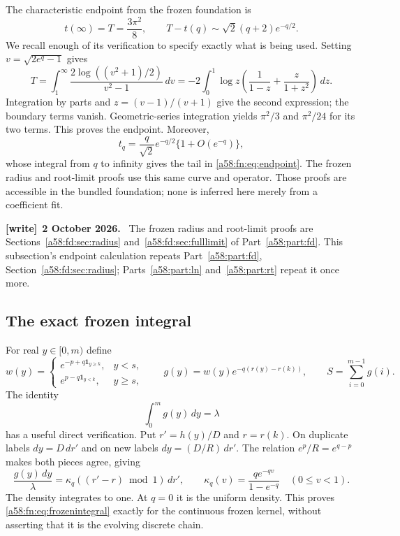 \documentclass[11pt,letterpaper]{article}
\theoremstyle{remark}
\newcommand{\one}{\mathbf 1}
\newenvironment{writenote}[1][]{\par\smallskip\begingroup\small
 \noindent\textbf{[write]}\if\relax\detokenize{#1}\relax\else~\textbf{#1.}\fi\ }%
 {\par\endgroup\smallskip}
\begin{document}
The characteristic endpoint from the frozen foundation is
\begin{equation}\label{a58:fn:eq:endpoint}
 t(\infty)=T=\frac{3\pi^2}{8},\qquad
 T-t(q)\sim\sqrt2(q+2)e^{-q/2}.
\end{equation}
We recall enough of its verification to specify exactly what is being used. Setting $v=\sqrt{2e^q-1}$ gives
\[
 T=\int_1^\infty\frac{2\log((v^2+1)/2)}{v^2-1}\,dv
   =-2\int_0^1\log z\left(\frac1{1-z}+\frac z{1+z^2}\right)\,dz.
\]
Integration by parts and $z=(v-1)/(v+1)$ give the second expression; the boundary terms vanish. Geometric-series integration yields $\pi^2/3$ and $\pi^2/24$ for its two terms. This proves the endpoint. Moreover,
\[
 t_q=\frac q{\sqrt2}e^{-q/2}\{1+O(e^{-q})\},
\]
whose integral from $q$ to infinity gives the tail in \eqref{a58:fn:eq:endpoint}.
The frozen radius and root-limit proofs use this same curve and operator. Those proofs are accessible in the bundled foundation; none is inferred here merely from a coefficient fit.
\begin{writenote}[2 October 2026]
The frozen radius and root-limit proofs are Sections~\ref{a58:fd:sec:radius} and~\ref{a58:fd:sec:fulllimit} of Part~\ref{a58:part:fd}. This subsection's endpoint calculation repeats Part~\ref{a58:part:fd}, Section~\ref{a58:fd:sec:radius}; Parts~\ref{a58:part:ln} and~\ref{a58:part:rt} repeat it once more.
\end{writenote}

\subsection{The exact frozen integral}
For real $y\in[0,m)$ define
\begin{equation}\label{a58:fn:eq:frozeng}
 w(y)=\begin{cases}e^{-p+q\one_{y\ge k}},&y<s,\\
 e^{p-q\one_{y<k}},&y\ge s,
 \end{cases}
 \qquad g(y)=w(y)e^{-q(r(y)-r(k))},\qquad
 S=\sum_{i=0}^{m-1}g(i).
\end{equation}
The identity
\begin{equation}\label{a58:fn:eq:frozenintegral}
 \int_0^m g(y)\,dy=\lambda
\end{equation}
has a useful direct verification. Put $r'=h(y)/D$ and $r=r(k)$. On duplicate labels $dy=D\,dr'$ and on new labels $dy=(D/R)\,dr'$. The relation $e^p/R=e^{q-p}$ makes both pieces agree, giving
\begin{equation}\label{a58:fn:eq:circle}
 \frac{g(y)\,dy}{\lambda}
 =\kappa_q((r'-r)\bmod1)\,dr',\qquad
 \kappa_q(v)=\frac{qe^{-qv}}{1-e^{-q}}\quad(0\le v<1).
\end{equation}
The density integrates to one. At $q=0$ it is the uniform density. This proves \eqref{a58:fn:eq:frozenintegral} exactly for the continuous frozen kernel, without asserting that it is the evolving discrete chain.
\end{document}
